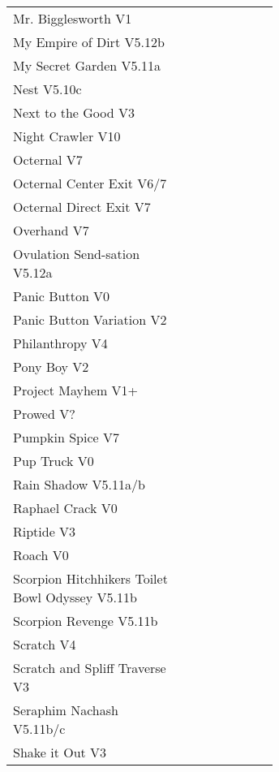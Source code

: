 \begin{flushleft}
\begin{center}
\begin{supertabular}{p{0.65\linewidth}r}
Mr. Bigglesworth V1 & \pageref{vr:Mr. Bigglesworth} \\
My Empire of Dirt V5.12b & \pageref{rt:My Empire of Dirt} \\
My Secret Garden V5.11a & \pageref{rt:My Secret Garden} \\
Nest V5.10c & \pageref{rt:Nest} \\
Next to the Good V3 & \pageref{rt:Next to the Good} \\
Night Crawler V10 & \pageref{rt:Night Crawler} \\
Octernal V7 & \pageref{rt:Octernal} \\
Octernal Center Exit V6/7 & \pageref{vr:Octernal Center Exit} \\
Octernal Direct Exit V7 & \pageref{vr:Octernal Direct Exit} \\
Overhand V7 & \pageref{rt:Overhand} \\
Ovulation Send-sation V5.12a & \pageref{rt:Ovulation Send-sation} \\
Panic Button V0 & \pageref{rt:Panic Button} \\
Panic Button Variation V2 & \pageref{vr:Panic Button Variation} \\
Philanthropy V4 & \pageref{rt:Philanthropy} \\
Pony Boy V2 & \pageref{rt:Pony Boy} \\
Project Mayhem V1+ & \pageref{rt:Project Mayhem} \\
Prowed V? & \pageref{vr:Prowed} \\
Pumpkin Spice V7 & \pageref{rt:Pumpkin Spice} \\
Pup Truck V0 & \pageref{rt:Pup Truck} \\
Rain Shadow V5.11a/b & \pageref{rt:Rain Shadow} \\
Raphael Crack V0 & \pageref{rt:Raphael Crack} \\
Riptide V3 & \pageref{rt:Riptide} \\
Roach V0 & \pageref{rt:Roach} \\
Scorpion Hitchhikers Toilet Bowl Odyssey V5.11b & \pageref{rt:Scorpion Hitchhikers Toilet Bowl Odyssey} \\
Scorpion Revenge V5.11b & \pageref{rt:Scorpion Revenge} \\
Scratch V4 & \pageref{rt:Scratch} \\
Scratch and Spliff Traverse V3 & \pageref{rt:Scratch and Spliff Traverse} \\
Seraphim Nachash V5.11b/c & \pageref{rt:Seraphim Nachash} \\
Shake it Out V3 & \pageref{vr:Shake it Out} \\

\end{supertabular}
\end{center}
\end{flushleft}
